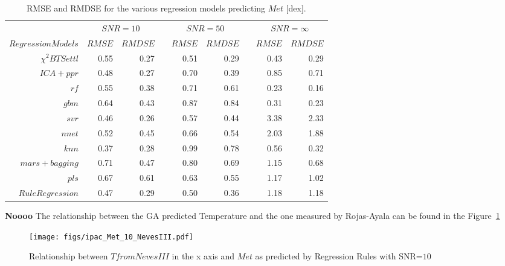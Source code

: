 %
%
\begin{table}\centering
\begin{tabular}{@{}rrrcrrcrr@{}}\toprule
& \multicolumn{2}{c}{$SNR = 10$} & \phantom{ab}& \multicolumn{2}{c}{$SNR = 50$} &
\phantom{ab} & \multicolumn{2}{c}{$SNR = \infty$}\\
\cmidrule{2-3} \cmidrule{5-6} \cmidrule{8-9}
$Regression Models$ & $RMSE$ & $RMDSE$ && $RMSE$ & $RMDSE$     && $RMSE$       & $RMDSE$ \\ \midrule
$\chi^2 BTSettl$    & 0.55    & 0.27   && 0.51 & 0.29 && 0.43  & 0.29 \\
$ ICA+ ppr$         & 0.48 & 0.27 && 0.70  & 0.39 && 0.85  & 0.71 \\
$rf $               & 0.55 & 0.38    && 0.71  & 0.61   && 0.23  & 0.16 \\
$gbm $              & 0.64 & 0.43 && 0.87  & 0.84  && 0.31  & 0.23 \\
$ svr $             & 0.46 & 0.26   && 0.57 & 0.44  && 3.38  & 2.33 \\
$ nnet $            & 0.52 & 0.45      && 0.66 & 0.54  && 2.03  & 1.88 \\
$ knn $             & 0.37  & 0.28   && 0.99  & 0.78 && 0.56 & 0.32 \\ 
$ mars+ bagging $   & 0.71  & 0.47 && 0.80   & 0.69   && 1.15    & 0.68 \\
$ pls $             & 0.67  & 0.61  && 0.63  & 0.55 && 1.17 & 1.02 \\ 
$Rule Regression $  & 0.47 & 0.29 && 0.50 & 0.36  && 1.18 &  1.18 \\

\bottomrule
\end{tabular}
\caption {RMSE and RMDSE for the various regression models predicting $Met$ [dex].} 
\label{tab:models_M_rmse} 
\end{table}


{\bf Noooo}
The relationship between the GA predicted Temperature and the one measured by Rojas-Ayala can be 
found in the Figure~\ref{fig:ipac_mt}
\begin{figure}
 \begin{center}
 \texttt{[image: figs/ipac\_Met\_10\_NevesIII.pdf]}
 \caption{Relationship between $ T from NevesIII $ in the x axis 
 and $ Met $ as predicted by Regression Rules with SNR=$10$}
 \label{fig:ipac_mt}
 \end{center}
\end{figure}


